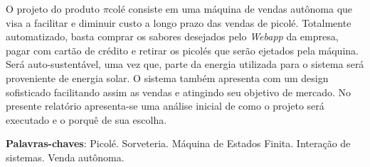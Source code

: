 \begin{resumo}

O projeto do produto $\pi$colé consiste em uma máquina de vendas autônoma que visa a facilitar e diminuir custo a longo prazo das vendas de picolé. Totalmente automatizado, basta comprar os sabores desejados pelo \textit{Webapp} da empresa, pagar com cartão de crédito e retirar os picolés que serão ejetados pela máquina. Será auto-sustentável, uma vez que, parte da energia utilizada para o sistema será proveniente de energia solar. O sistema também apresenta com um design sofisticado facilitando assim as vendas e atingindo seu objetivo de mercado. No presente relatório apresenta-se uma análise inicial de como o projeto será executado e o porquê de sua escolha.

 \vspace{\onelineskip}
    
 \noindent
 \textbf{Palavras-chaves}: Picolé. Sorveteria. Máquina de Estados Finita. Interação de sistemas. Venda autônoma.
\end{resumo}
